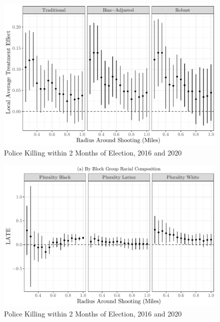 \documentclass[
  12pt,
]{article}
\begin{document}
\begin{figure}[h]

{\centering \includegraphics{shoot_to_files/figure-latex/dists-1} 

}

\caption{\label{fig:map}Police Killing within 2 Months of Election, 2016 and 2020}\label{fig:dists}
\end{figure}

\begin{figure}[h]

{\centering \includegraphics{shoot_to_files/figure-latex/nhood-1} 

}

\caption{\label{fig:map}Police Killing within 2 Months of Election, 2016 and 2020}\label{fig:nhood}
\end{figure}
\end{document}
